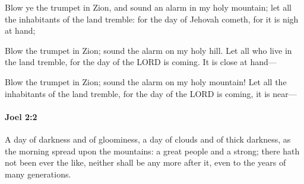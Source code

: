 			\begin{versebox}
					\item[BHS] 
					\item[LXX] 
					\item[ASV] Blow ye the trumpet in Zion, and sound an alarm in my holy mountain; let all the inhabitants of the land tremble: for the day of Jehovah cometh, for it is nigh at hand;
					\item[NIV] Blow the trumpet in Zion; sound the alarm on my holy hill. Let all who live in the land tremble, for the day of the LORD is coming. It is close at hand—
					\item[NRSV] Blow the trumpet in Zion; sound the alarm on my holy mountain! Let all the inhabitants of the land tremble, for the day of the LORD is coming, it is near—
			\end{versebox}

		\paragraph{Joel 2:2} %
			\label{JOEL-2-2}

			A day of darkness and of gloominess, a day of clouds and of thick darkness, as the morning spread upon the mountains: a great people and a strong; there hath not been ever the like, neither shall be any more after it, even to the years of many generations.

